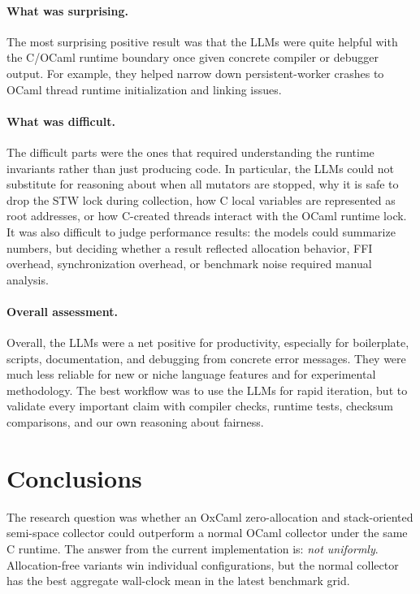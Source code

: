 \documentclass[11pt,a4paper]{article}
\begin{document}
\paragraph{What was surprising.}
The most surprising positive result was that the LLMs were quite helpful with
the C/OCaml runtime boundary once given concrete compiler or debugger output.
For example, they helped narrow down persistent-worker crashes to OCaml thread
runtime initialization and linking issues.

\paragraph{What was difficult.}
The difficult parts were the ones that required understanding the runtime
invariants rather than just producing code.  In particular, the LLMs could not
substitute for reasoning about when all mutators are stopped, why it is safe to
drop the STW lock during collection, how C local variables are represented as
root addresses, or how C-created threads interact with the OCaml runtime lock.
It was also difficult to judge performance results: the models could summarize
numbers, but deciding whether a result reflected allocation behavior, FFI
overhead, synchronization overhead, or benchmark noise required manual
analysis.

\paragraph{Overall assessment.}
Overall, the LLMs were a net positive for productivity, especially for
boilerplate, scripts, documentation, and debugging from concrete error messages.
They were much less reliable for new or niche language features and for
experimental methodology.  The best workflow was to use the LLMs for rapid
iteration, but to validate every important claim with compiler checks, runtime
tests, checksum comparisons, and our own reasoning about fairness.

\section{Conclusions}
\label{sec:conclusions}

The research question was whether an OxCaml zero-allocation and stack-oriented
semi-space collector could outperform a normal OCaml collector under the same C
runtime.  The answer from the current implementation is: \emph{not uniformly}.
Allocation-free variants win individual configurations, but the normal collector
has the best aggregate wall-clock mean in the latest benchmark grid.
\end{document}
